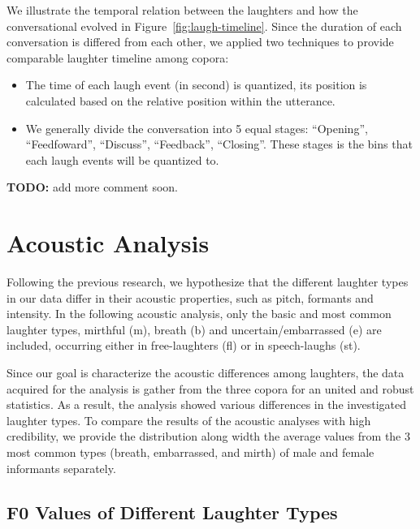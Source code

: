 \documentclass[10pt,journal,compsoc]{IEEEtran}
\begin{document}
We illustrate the temporal relation between the laughters and how the conversational evolved in Figure~\ref{fig:laugh-timeline}. Since the duration of each conversation is differed from each other, we applied two techniques to provide comparable laughter timeline among copora:

\begin{itemize}
    \item The time of each laugh event (in second) is quantized, its position is calculated based on the relative position within the utterance.
    \item We generally divide the conversation into 5 equal stages: ``Opening'', ``Feedfoward'', ``Discuss'', ``Feedback'', ``Closing''. These stages is the bins that each laugh events will be quantized to.
\end{itemize}

\textbf{TODO:} add more comment soon.

\section{Acoustic Analysis}
\label{sec:acoustic-analysis}

Following the previous research, we hypothesize that the different laughter types in our data differ in their acoustic properties, such as pitch, formants and intensity. In the following acoustic analysis, only the basic and most common laughter types, mirthful (m), breath (b) and uncertain/embarrassed (e) are included, occurring either in free-laughters (fl) or in speech-laughs (st).

Since our goal is characterize the acoustic differences among laughters, the data acquired for the analysis is gather from the three copora for an united and robust statistics. As a result, the analysis showed various differences in the investigated laughter types. To compare the results of the acoustic analyses with high credibility, we provide the distribution along width the average values from the 3 most common types (breath, embarrassed, and mirth) of male and female informants separately.

\subsection{F0 Values of Different Laughter Types}
\end{document}
